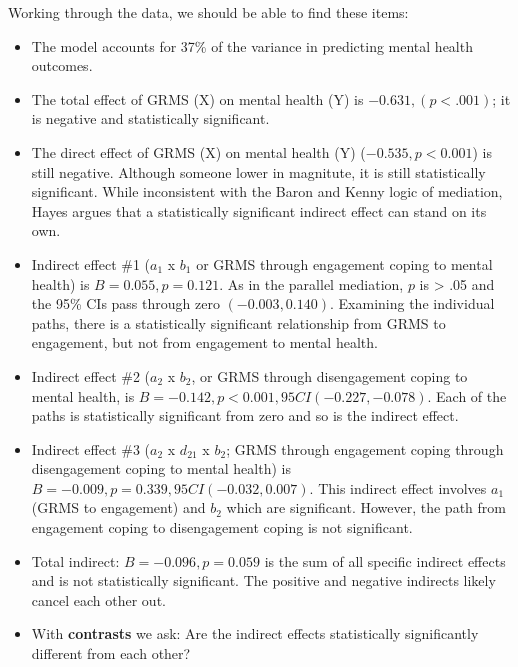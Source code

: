 \documentclass[
  11pt,
]{book}
\providecommand{\tightlist}{%
  \setlength{\itemsep}{0pt}\setlength{\parskip}{0pt}}
\begin{document}
Working through the data, we should be able to find these items:

\begin{itemize}
\tightlist
\item
  The model accounts for 37\% of the variance in predicting mental health outcomes.
\item
  The total effect of GRMS (X) on mental health (Y) is \(-0.631, (p < .001)\); it is negative and statistically significant.
\item
  The direct effect of GRMS (X) on mental health (Y) (\(-0.535, p < 0.001\)) is still negative. Although someone lower in magnitute, it is still statistically significant. While inconsistent with the Baron and Kenny \citeyearpar{baron_moderator-mediator_1986} logic of mediation, Hayes \citep{hayes_more_2022} argues that a statistically significant indirect effect can stand on its own.
\item
  Indirect effect \#1 (\(a_{1}\) x \(b_{1}\) or GRMS through engagement coping to mental health) is \(B = 0.055, p =0.121\). As in the parallel mediation, \(p\) is \textgreater{} .05 and the 95\% CIs pass through zero \((-0.003, 0.140)\). Examining the individual paths, there is a statistically significant relationship from GRMS to engagement, but not from engagement to mental health.
\item
  Indirect effect \#2 (\(a_{2}\) x \(b_{2}\), or GRMS through disengagement coping to mental health, is \(B = -0.142, p < 0.001, 95CI (-0.227, -0.078)\). Each of the paths is statistically significant from zero and so is the indirect effect.
\item
  Indirect effect \#3 (\(a_{2}\) x \(d_{21}\) x \(b_{2}\); GRMS through engagement coping through disengagement coping to mental health) is \(B = -0.009, p = 0.339, 95CI (-0.032, 0.007)\). This indirect effect involves \(a_{1}\) (GRMS to engagement) and \(b_{2}\) which are significant. However, the path from engagement coping to disengagement coping is not significant.
\item
  Total indirect: \(B = -0.096, p = 0.059\) is the sum of all specific indirect effects and is not statistically significant. The positive and negative indirects likely cancel each other out.
\item
  With \textbf{contrasts} we ask: Are the indirect effects statistically significantly different from each other?


\end{itemize}
\end{document}
